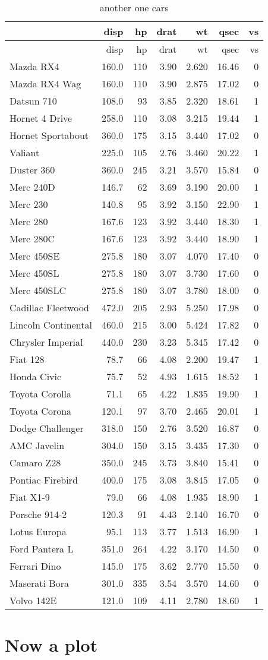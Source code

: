 \documentclass[]{article}
\begin{document}
\begin{longtable}[]{@{}lrrrrrr@{}}
\caption{another one cars}\tabularnewline
\toprule
& disp & hp & drat & wt & qsec & vs\tabularnewline
\midrule
\endfirsthead
\toprule
& disp & hp & drat & wt & qsec & vs\tabularnewline
\midrule
\endhead
Mazda RX4 & 160.0 & 110 & 3.90 & 2.620 & 16.46 & 0\tabularnewline
Mazda RX4 Wag & 160.0 & 110 & 3.90 & 2.875 & 17.02 & 0\tabularnewline
Datsun 710 & 108.0 & 93 & 3.85 & 2.320 & 18.61 & 1\tabularnewline
Hornet 4 Drive & 258.0 & 110 & 3.08 & 3.215 & 19.44 & 1\tabularnewline
Hornet Sportabout & 360.0 & 175 & 3.15 & 3.440 & 17.02 &
0\tabularnewline
Valiant & 225.0 & 105 & 2.76 & 3.460 & 20.22 & 1\tabularnewline
Duster 360 & 360.0 & 245 & 3.21 & 3.570 & 15.84 & 0\tabularnewline
Merc 240D & 146.7 & 62 & 3.69 & 3.190 & 20.00 & 1\tabularnewline
Merc 230 & 140.8 & 95 & 3.92 & 3.150 & 22.90 & 1\tabularnewline
Merc 280 & 167.6 & 123 & 3.92 & 3.440 & 18.30 & 1\tabularnewline
Merc 280C & 167.6 & 123 & 3.92 & 3.440 & 18.90 & 1\tabularnewline
Merc 450SE & 275.8 & 180 & 3.07 & 4.070 & 17.40 & 0\tabularnewline
Merc 450SL & 275.8 & 180 & 3.07 & 3.730 & 17.60 & 0\tabularnewline
Merc 450SLC & 275.8 & 180 & 3.07 & 3.780 & 18.00 & 0\tabularnewline
Cadillac Fleetwood & 472.0 & 205 & 2.93 & 5.250 & 17.98 &
0\tabularnewline
Lincoln Continental & 460.0 & 215 & 3.00 & 5.424 & 17.82 &
0\tabularnewline
Chrysler Imperial & 440.0 & 230 & 3.23 & 5.345 & 17.42 &
0\tabularnewline
Fiat 128 & 78.7 & 66 & 4.08 & 2.200 & 19.47 & 1\tabularnewline
Honda Civic & 75.7 & 52 & 4.93 & 1.615 & 18.52 & 1\tabularnewline
Toyota Corolla & 71.1 & 65 & 4.22 & 1.835 & 19.90 & 1\tabularnewline
Toyota Corona & 120.1 & 97 & 3.70 & 2.465 & 20.01 & 1\tabularnewline
Dodge Challenger & 318.0 & 150 & 2.76 & 3.520 & 16.87 & 0\tabularnewline
AMC Javelin & 304.0 & 150 & 3.15 & 3.435 & 17.30 & 0\tabularnewline
Camaro Z28 & 350.0 & 245 & 3.73 & 3.840 & 15.41 & 0\tabularnewline
Pontiac Firebird & 400.0 & 175 & 3.08 & 3.845 & 17.05 & 0\tabularnewline
Fiat X1-9 & 79.0 & 66 & 4.08 & 1.935 & 18.90 & 1\tabularnewline
Porsche 914-2 & 120.3 & 91 & 4.43 & 2.140 & 16.70 & 0\tabularnewline
Lotus Europa & 95.1 & 113 & 3.77 & 1.513 & 16.90 & 1\tabularnewline
Ford Pantera L & 351.0 & 264 & 4.22 & 3.170 & 14.50 & 0\tabularnewline
Ferrari Dino & 145.0 & 175 & 3.62 & 2.770 & 15.50 & 0\tabularnewline
Maserati Bora & 301.0 & 335 & 3.54 & 3.570 & 14.60 & 0\tabularnewline
Volvo 142E & 121.0 & 109 & 4.11 & 2.780 & 18.60 & 1\tabularnewline
\bottomrule
\end{longtable}

\section{Now a plot}\label{now-a-plot-2}
\end{document}
